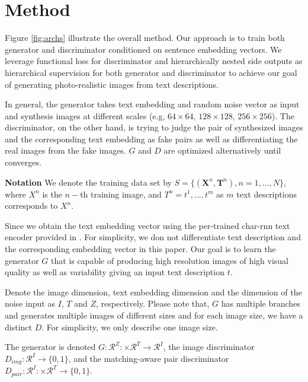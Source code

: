 \documentclass[10pt,twocolumn,letterpaper]{article}
\begin{document}
\section{Method}
Figure \ref{fig:archs} illustrate the overall method.
Our approach is to train both generator and discriminator conditioned on sentence embedding vectors. We leverage functional loss for discriminator and hierarchically nested side outputs as hierarchical supervision for both generator and discriminator to achieve our goal of generating photo-realistic images from text descriptions.  

In general, the generator takes text embedding and random noise vector as input and synthesis images at different scales (e.g, $64\times64$, $128\times128$, $256\times256$). The discriminator, on the other hand, is trying to judge the pair of synthesized images and the corresponding text embedding as fake pairs as well as differentiating the real images from the fake images. $G$ and $D$ are optimized alternatively until converges.


\textbf{Notation } 
We denote the training data set by $S=\{(\bm{X}^n, \bm{T}^n),n=1,...,N\}$, where $X^n$ is the $n-$th training image, and $T^n={t^1,...,t^m}$ as $m$ text descriptions corresponds to $X^n$. 

Since we obtain the text embedding vector  using the per-trained char-rnn text encoder provided in \cite{reed2016generative}. For simplicity, we don not differentiate text description and the corresponding embedding vector in this paper.  Our goal is to learn the generator $G$ that is capable of producing high resolution images of high visual quality as well as variability giving an input text description $t$.  

Denote the image dimension, text embedding dimension and the dimension of the noise input as $I$, $T$ and $Z$, respectively. Please note that, $G$ has multiple branches and generates multiple images of different sizes and for each image size, we have a distinct $D$. For simplicity, we only describe one image size.  

The generator is denoted $G: \mathcal{R}^{Z}: \times \mathcal{R}^{T}\rightarrow\mathcal{R}^{I}$, the image discriminator $D_{img}: \mathcal{R}^{I}\rightarrow\{0, 1\}$, and the matching-aware pair discriminator $D_{pair}: \mathcal{R}^{I}: \times \mathcal{R}^{T}\rightarrow\{0, 1\}$. 
\end{document}
